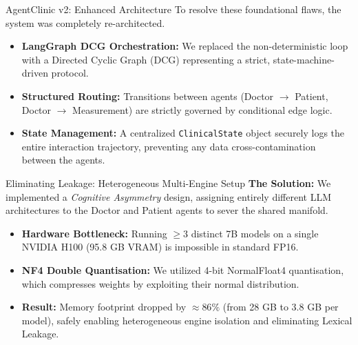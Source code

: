 \documentclass[10pt, aspectratio=169]{beamer}
\begin{document}
\begin{frame}{AgentClinic v2: Enhanced Architecture}
    To resolve these foundational flaws, the system was completely re-architected.
    \vspace{0.3cm}
    \begin{itemize}
        \item \textbf{LangGraph DCG Orchestration:} We replaced the non-deterministic loop with a Directed Cyclic Graph (DCG) representing a strict, state-machine-driven protocol.
        \item \textbf{Structured Routing:} Transitions between agents (Doctor $\to$ Patient, Doctor $\to$ Measurement) are strictly governed by conditional edge logic.
        \item \textbf{State Management:} A centralized \texttt{ClinicalState} object securely logs the entire interaction trajectory, preventing any data cross-contamination between the agents.
    \end{itemize}
\end{frame}

\begin{frame}{Eliminating Leakage: Heterogeneous Multi-Engine Setup}
    \textbf{The Solution:} We implemented a \textit{Cognitive Asymmetry} design, assigning entirely different LLM architectures to the Doctor and Patient agents to sever the shared manifold.
    \vspace{0.3cm}
    \begin{itemize}
        \item \textbf{Hardware Bottleneck:} Running $\ge3$ distinct 7B models on a single NVIDIA H100 (95.8 GB VRAM) is impossible in standard FP16.
        \item \textbf{NF4 Double Quantisation:} We utilized 4-bit NormalFloat4 quantisation, which compresses weights by exploiting their normal distribution.
        \item \textbf{Result:} Memory footprint dropped by $\approx 86\%$ (from 28 GB to 3.8 GB per model), safely enabling heterogeneous engine isolation and eliminating Lexical Leakage.
    \end{itemize}
\end{frame}
\end{document}
